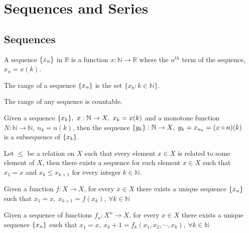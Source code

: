 
\chapter{Sequences and Series}
\section{Sequences}
	\begin{definition}[sequence]
		A sequence $\{x_n\}$ in $\mathbb{R}$ is a function $x: \mathbb{N} \to \mathbb{R}$ where the $n^{th}$ term of the sequence, $x_n = x(k)$.
	\end{definition}

	\begin{definition}
		The range of a sequence $\{x_n\}$ is the set $\{ x_k : k \in \mathbb{N} \}$.
	\end{definition}

	\begin{remark}
		The range of any sequence is countable.
	\end{remark}

	\begin{definition}[subsequence]
		Given a sequence $\sequence{x_k},\ x:\mathbb{N} \to X,\ x_k = x(k)$ and a monotone function $N:\mathbb{N} \to \mathbb{N},\ n_k = n(k)$, then the sequence $\{y_k\} : \mathbb{N} \to X,\ y_k = x_{n_k} = (x \circ n)(k)$ is a subsequence of $\{x_k\}$.
	\end{definition}

	\begin{axiom}
		Let $\le$ be a relation on $X$ such that every element $x \in X$ is related to some element of $X$, then there exists a sequence for each element $x \in X$ such that $x_1 = x$ and $x_k \le x_{k+1}$ for every integer $k \in \mathbb{N}$.\cite{kharazishvili}
	\end{axiom}

	\begin{theorem}
		Given a function $f:X \to X$, for every $x \in X$ there exists a unique sequence $\{x_n\}$ such that $x_1 = x,\ x_{k+1} = f(x_k),\ \forall k \in \mathbb{N}$
	\end{theorem}

	\begin{corollary}
		Given a sequence of functions $f_n : X^n \to X$, for every $x \in X$ there exists a unique sequence $\{x_n\}$ such that $x_1 = x,\ x_k+1 = f_k(x_1,x_2,\cdots,x_k),\ \forall k \in \mathbb{N}$
	\end{corollary}

